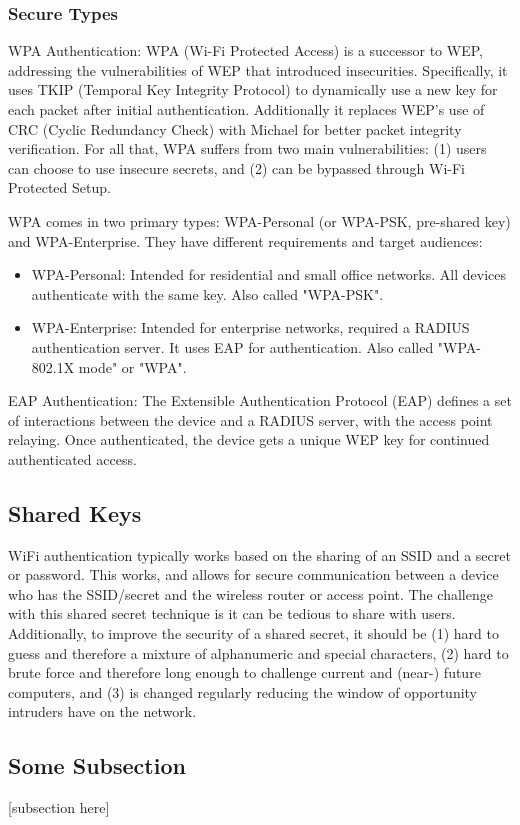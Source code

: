 \subsubsection{Secure Types}
\begin{description}
  \item{WPA Authentication:} WPA (Wi-Fi Protected Access) is a successor to WEP, addressing the
  vulnerabilities of WEP that introduced insecurities. Specifically, it uses TKIP (Temporal Key
  Integrity Protocol) to dynamically use a new key for each packet after initial authentication.
  Additionally it replaces WEP's use of CRC (Cyclic Redundancy Check) with Michael for better packet
  integrity verification. For all that, WPA suffers from two main vulnerabilities: (1) users can
  choose to use insecure secrets, and (2) can be bypassed through Wi-Fi Protected Setup.

  WPA comes in two primary types: WPA-Personal (or WPA-PSK, pre-shared key) and WPA-Enterprise. They
  have different requirements and target audiences: \cite{wiki:WPA}
  \begin{itemize}
  \item{WPA-Personal:} Intended for residential and small office networks. All devices authenticate
  with the same key. Also called "WPA-PSK".
  \item{WPA-Enterprise:} Intended for enterprise networks, required a RADIUS authentication server.
  It uses EAP for authentication. Also called "WPA-802.1X mode" or "WPA".
  \end{itemize}

  \item{EAP Authentication:} The Extensible Authentication Protocol (EAP) defines a set of
  interactions between the device and a RADIUS server, with the access point relaying. Once
  authenticated, the device gets a unique WEP key for continued authenticated access.
\end{description}

\subsection{Shared Keys}
WiFi authentication typically works based on the sharing of an SSID and a secret or password.
This works, and allows for secure communication between a device who has the SSID/secret and
the wireless router or access point. The challenge with this shared secret technique is it
can be tedious to share with users. Additionally, to improve the security of a shared secret,
it should be (1) hard to guess and therefore a mixture of alphanumeric and special characters,
(2) hard to brute force and therefore long enough to challenge current and (near-) future computers,
and (3) is changed regularly reducing the window of opportunity intruders have on the network.



\subsection{Some Subsection}
[subsection here]
